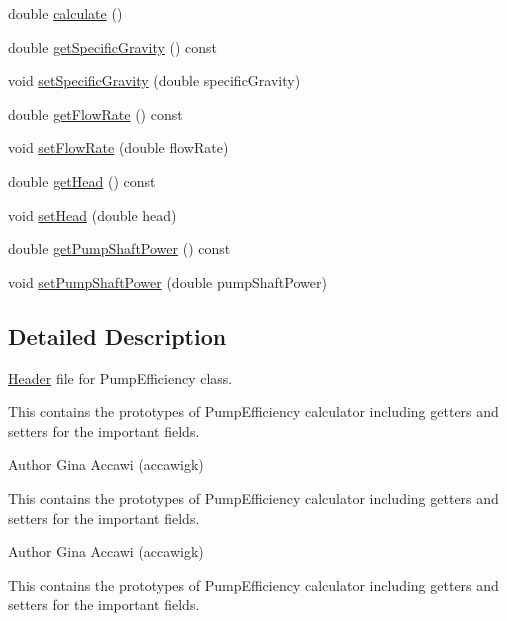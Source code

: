 \begin{DoxyCompactItemize}
\item 
double \hyperlink{class_mover_efficiency_ae7b997f1e2fcff1d4263e9921c1a8d9b}{calculate} ()
\item 
double \hyperlink{class_mover_efficiency_a4acdd89fec01daef4902238202e00884}{get\+Specific\+Gravity} () const
\item 
void \hyperlink{class_mover_efficiency_aed095f525636345bdfebe76774afa2d4}{set\+Specific\+Gravity} (double specific\+Gravity)
\item 
double \hyperlink{class_mover_efficiency_a3b0d468a68703127624ab996f03d2368}{get\+Flow\+Rate} () const
\item 
void \hyperlink{class_mover_efficiency_a35bf328fcd7e8334d552bce8b8704379}{set\+Flow\+Rate} (double flow\+Rate)
\item 
double \hyperlink{class_mover_efficiency_a9ce5f2dba38ae4f271bdb2c018667144}{get\+Head} () const
\item 
void \hyperlink{class_mover_efficiency_a1dce269494ecdfc348c8d0a3f9d33df6}{set\+Head} (double head)
\item 
double \hyperlink{class_mover_efficiency_a367c3cb3a070cef9de5e3ca87bbf62fe}{get\+Pump\+Shaft\+Power} () const
\item 
void \hyperlink{class_mover_efficiency_afc2fea6487106318d441a0130ed2934d}{set\+Pump\+Shaft\+Power} (double pump\+Shaft\+Power)
\end{DoxyCompactItemize}


\subsection{Detailed Description}
\hyperlink{class_header}{Header} file for Pump\+Efficiency class. 

This contains the prototypes of Pump\+Efficiency calculator including getters and setters for the important fields.

\begin{DoxyAuthor}{Author}
Gina Accawi (accawigk) 
\end{DoxyAuthor}


This contains the prototypes of Pump\+Efficiency calculator including getters and setters for the important fields.

\begin{DoxyAuthor}{Author}
Gina Accawi (accawigk) 
\end{DoxyAuthor}


This contains the prototypes of Pump\+Efficiency calculator including getters and setters for the important fields.

